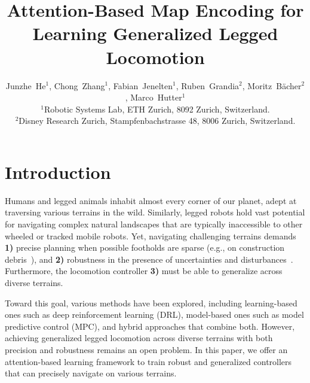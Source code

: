 \documentclass[9pt,twocolumn,twoside]{osajnl}
\title{Attention-Based Map Encoding for Learning Generalized Legged Locomotion}
\author{
Junzhe~He$^{1}$, 
Chong~Zhang$^{1}$, 
Fabian~Jenelten$^{1}$,
Ruben~Grandia$^{2}$,
Moritz~B{\"a}cher$^{2}$,
Marco~Hutter$^{1}$ 
\\
\normalsize{$^{1}$Robotic Systems Lab, ETH Zurich, 8092 Zurich, Switzerland.} \\
\normalsize{$^{2}$Disney Research Zurich, Stampfenbachstrasse 48, 8006 Zurich, Switzerland.} \\
}
\begin{document}
 
\maketitle 


\section*{Introduction}
\label{sec:intro}
Humans and legged animals inhabit almost every corner of our planet, adept at traversing various terrains in the wild.
Similarly, legged robots hold vast potential for navigating complex natural landscapes that are typically inaccessible to other wheeled or tracked mobile robots. 
Yet, navigating challenging terrains demands \textbf{1)} precise planning when possible footholds are sparse (e.g., on construction debris~\cite{jenelten2023dtc}), and \textbf{2)} robustness in the presence of uncertainties and disturbances~\cite{Lee2020,Miki2022}. Furthermore, the locomotion controller \textbf{3)} must be able to generalize across diverse terrains.

Toward this goal, various methods have been explored, including learning-based ones such as deep reinforcement learning (DRL), model-based ones such as model predictive control (MPC), and hybrid approaches that combine both. However, achieving generalized legged locomotion across diverse terrains with both precision and robustness remains an open problem. In this paper, we offer an attention-based learning framework to train robust and generalized controllers that can precisely navigate on various terrains.
\end{document}

